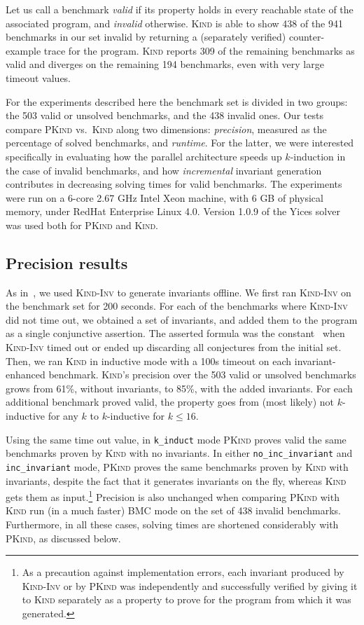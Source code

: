\documentclass[submission,copyright,creativecommons]{eptcs}
\newcommand{\define}[1]{\emph{#1}}
\newcommand{\Kind}{\textrm{\textsc{Kind}}\xspace}
\newcommand{\KindInv}{\textrm{\textsc{Kind}-\textsc{Inv}}\xspace}
\newcommand{\PKind}{\textrm{\textsc{PKind}}\xspace}
\begin{document}
Let us call a benchmark \emph{valid} if its property holds 
in every reachable state of the associated program, 
and \define{invalid} otherwise. \Kind is able
to show 438 of the 941 benchmarks in our set invalid by
returning a (separately verified) counter-example trace for the
program.  \Kind reports 309 of the remaining benchmarks as valid and
diverges on the remaining 194 benchmarks, even with very large timeout
values. 


For the experiments described here the benchmark set is divided in two
groups: the 503 valid or unsolved benchmarks, and the 438
invalid ones.  Our tests compare \PKind vs.~\Kind
along two dimensions: \emph{precision}, measured as the percentage of solved
benchmarks, and \emph{runtime}.  For the latter, we were interested
specifically in evaluating how the parallel architecture speeds up
$k$-induction in the case of invalid benchmarks, and how
\emph{incremental} invariant generation contributes in decreasing
solving times for valid benchmarks. The experiments were run on a
6-core 2.67 GHz Intel Xeon machine, with 6 GB of physical memory,
under RedHat Enterprise Linux 4.0.  Version 1.0.9 of the Yices solver
was used both for \PKind and \Kind.


\subsection{Precision results}

As in~\cite{Kahsai-Ge-Tinelli-10}, we used \KindInv to generate
invariants offline.  We first ran \KindInv on
the benchmark set for 200 seconds.  For each of the benchmarks where
\KindInv did not time out, we obtained a set of invariants, and added
them to the program as a single conjunctive assertion.  The asserted
formula was the constant \true\ when \KindInv timed out or ended up
discarding all conjectures from the initial set.  Then, we
ran \Kind in inductive mode with a 100s timeout on each
invariant-enhanced benchmark.  
\Kind's precision over the 503 valid or unsolved benchmarks 
grows from 61\%, without invariants, to 85\%, with the added invariants.  
For each additional benchmark proved valid, 
the property goes from (most likely) not $k$-inductive for any $k$ 
to $k$-inductive for $k \leq 16$.

Using the same time out value, in \texttt{\small k\_induct} mode \PKind
proves valid the same benchmarks proven by \Kind with no invariants.
In either \texttt{\small no\_inc\_invariant} and \texttt{\small inc\_invariant}
mode, \PKind proves the same benchmarks proven by \Kind with
invariants, despite the fact that it generates invariants on the fly,
whereas \Kind gets them as input.\footnote{ As a precaution against
  implementation errors, each invariant produced by \KindInv or by
  \PKind was independently and successfully verified by giving it to
  \Kind separately as a property to prove for the program from which
  it was generated.  
  }
Precision is also unchanged when comparing \PKind with \Kind run 
(in a much faster) BMC mode on the set of 438 invalid benchmarks.  
Furthermore, in all these cases, solving times are shortened considerably with
\PKind, as discussed below.
\end{document}
